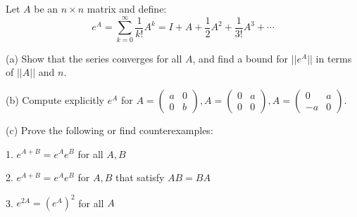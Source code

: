 \begin{exercise}{10}
    Let $A$ be an $n \times n$ matrix and define:
    $$e^A = \sum_{k=0}^{\infty} \frac{1}{k!}A^k = I + A + \frac{1}{2} A^2 + \frac{1}{3!}A^3 + \cdots$$

    (a) Show that the series converges for all $A$, and find a bound for $\lvert \lvert e^A \rvert \rvert$ in terms of $\lvert \lvert A \rvert \rvert$ and $n$.

    (b) Compute explicitly $e^A$ for $A = \begin{pmatrix} a & 0 \\ 0 & b \end{pmatrix}, A = \begin{pmatrix} 0 & a \\ 0 & 0 \end{pmatrix}, A= \begin{pmatrix}
        0 & a \\ -a & 0
    \end{pmatrix}.$

    (c) Prove the following or find counterexamples:

    1. $e^{A+B} = e^Ae^B$ for all $A, B$
    
    2. $e^{A+B} = e^Ae^B$ for $A, B$ that satisfy $AB = BA$

    3. $e^{2A} = {(e^A)}^2$ for all $A$
\end{exercise}

